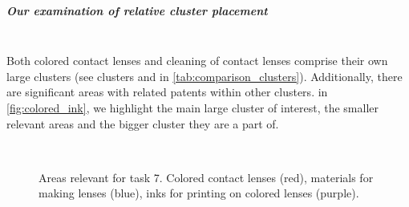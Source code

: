 \subparagraph{Our examination of relative cluster placement}~\\
Both colored contact lenses and cleaning of contact lenses comprise their own large clusters (see clusters  and  in \autoref{tab:comparison_clusters}).
Additionally, there are significant areas with related patents within other clusters.
in \autoref{fig:colored_ink}, we highlight the main large cluster of interest, the smaller relevant areas and the bigger cluster they are a part of.

\begin{figure}[!]
    \centering
    \\
    \caption{Areas relevant for task 7. Colored contact lenses (red), materials for making lenses (blue), inks for printing on colored lenses (purple).}
    \label{fig:colored_ink}
\end{figure}

